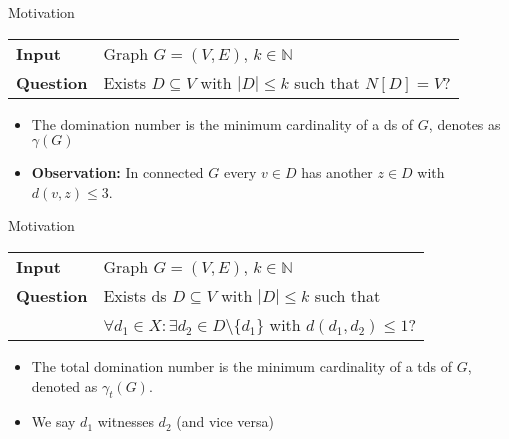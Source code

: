 \begin{frame}[c]{Motivation}
\begin{tcolorbox}[colback=TUMBlueLighter,title=\dom]
    \begin{tabularx}{1.0\textwidth}{>{\hsize=0.30\hsize}X>{\hsize=0.8\hsize}X}
        \textbf{Input} & Graph $G = (V, E)$, $k \in \mathbb{N}$\\
        \textbf{Question} & Exists {$D \subseteq V$} with $|D| \leq k$ such that ${N[D] = V}$? \\
    \end{tabularx}
\end{tcolorbox}

\begin{itemize}
\pause \item The domination number is the minimum cardinality of a ds of $G$, denotes as $\gamma(G)$
\pause \item \textbf{Observation:} In connected $G$ every $v\in D$ has another $z \in D$ with $d(v,z) \leq 3$.
\end{itemize}

\end{frame}

\begin{frame}[c]{Motivation}
\begin{tcolorbox}[colback=TUMBlueLighter,title=\tdom]
    \begin{tabularx}{1.0\textwidth}{>{\hsize=0.30\hsize}X>{\hsize=0.8\hsize}X}
        \textbf{Input} & Graph $G = (V, E)$, $k \in \mathbb{N}$\\
        \textbf{Question} & Exists ds $D \subseteq V$ with $|D| \leq k$ such that \\ 
       &  $\forall d_1 \in X :\exists d_2 \in D \setminus \{d_1\}$ with ${d(d_1, d_2) \leq 1}$? \\
    \end{tabularx}
\end{tcolorbox}

\begin{itemize}
 \pause \item The total domination number is the minimum cardinality of a tds of $G$, denoted as $\gamma_t(G)$.
 \pause \item We say $d_1$ witnesses $d_2$ (and vice versa)
\end{itemize}

\end{frame}

